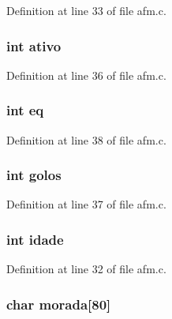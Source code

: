 \-Definition at line 33 of file afm.\-c.

\hypertarget{structjogador_a5bc3bc4334890083c1af35103dae7964}{
\subsubsection[{ativo}]{\setlength{\rightskip}{0pt plus 5cm}int {\bf ativo}}}\label{structjogador_a5bc3bc4334890083c1af35103dae7964}


\-Definition at line 36 of file afm.\-c.

\hypertarget{structjogador_a4003fea83807abede669219efed9948b}{
\subsubsection[{eq}]{\setlength{\rightskip}{0pt plus 5cm}int {\bf eq}}}\label{structjogador_a4003fea83807abede669219efed9948b}


\-Definition at line 38 of file afm.\-c.

\hypertarget{structjogador_a75eadc222dfc01c3e9c17f4ee4d081b6}{
\subsubsection[{golos}]{\setlength{\rightskip}{0pt plus 5cm}int {\bf golos}}}\label{structjogador_a75eadc222dfc01c3e9c17f4ee4d081b6}


\-Definition at line 37 of file afm.\-c.

\hypertarget{structjogador_ad5ea2e19b7deb827930edce70e13e3b8}{
\subsubsection[{idade}]{\setlength{\rightskip}{0pt plus 5cm}int {\bf idade}}}\label{structjogador_ad5ea2e19b7deb827930edce70e13e3b8}


\-Definition at line 32 of file afm.\-c.

\hypertarget{structjogador_a3df114e4e75498c37caefddacb73b269}{
\subsubsection[{morada}]{\setlength{\rightskip}{0pt plus 5cm}char {\bf morada}\mbox{[}80\mbox{]}}}\label{structjogador_a3df114e4e75498c37caefddacb73b269}


